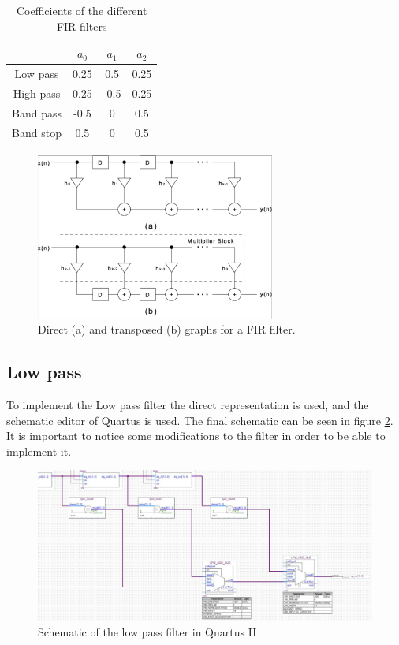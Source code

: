 \documentclass[12pt]{article}   	%
\begin{document}
\begin{table}[htbp]
	\centering
\begin{tabular}{|c|c|c|c|}
	\hline
	& $a_0$ & $a_1$ & $a_2$ \\
	\hline
	Low pass & 0.25 & 0.5 & 0.25 \\
	\hline
	High pass & 0.25 & -0.5 & 0.25 \\
	\hline
	Band pass & -0.5 & 0 & 0.5 \\
	\hline
	Band stop & 0.5 & 0 & 0.5 \\
	\hline
\end{tabular}
\caption{Coefficients of the different FIR filters}
\label{tab:coeffs}
\end{table}


\begin{figure}[htbp]
	\begin{center}
		\includegraphics[width=0.7\textwidth]{img/FIR_imp}
		\caption{Direct (a) and transposed (b) graphs for a FIR filter.}
		\label{fig:FIR_imp}
	\end{center}
\end{figure}



\subsection{Low pass}

To implement the Low pass filter the direct representation is used, and the schematic editor of Quartus is used. The final schematic can be seen in figure \ref{fig:LP_sh}. It is important to notice some modifications to the filter in order to be able to implement it.


\begin{figure}[htbp]
\begin{center}
\includegraphics[width=\textwidth]{img/low_pass_direct_graph.png}
\caption{Schematic of the low pass filter in Quartus II}
\label{fig:LP_sh}
\end{center}
\end{figure}
\end{document}

